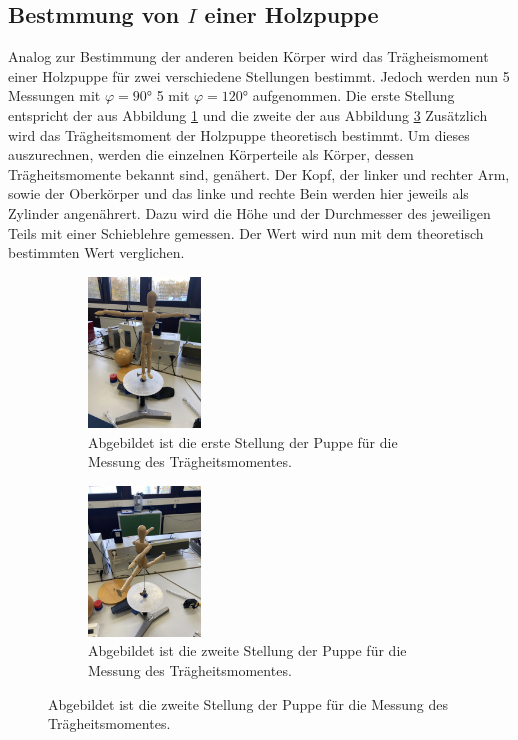     \subsection{Bestmmung von $I$ einer Holzpuppe}
    Analog zur Bestimmung der anderen beiden Körper wird das Trägheismoment einer Holzpuppe für zwei verschiedene Stellungen bestimmt.
    Jedoch werden nun 5 Messungen mit $\varphi= 90$\unit{\degree} 5  mit $\varphi= 120$\unit{\degree} aufgenommen.
    Die erste Stellung entspricht der aus Abbildung \ref{fig:Stellung1} und die zweite der aus Abbildung \ref{fig:Stellung2} %
    Zusätzlich wird das Trägheitsmoment der Holzpuppe theoretisch bestimmt.
    Um dieses auszurechnen, werden die einzelnen Körperteile als Körper, dessen Trägheitsmomente bekannt sind, genähert.
    Der Kopf, der linker und rechter Arm, sowie der Oberkörper und das linke und rechte Bein werden hier jeweils als Zylinder angenährert.
    Dazu wird die Höhe und der Durchmesser des jeweiligen Teils mit einer Schieblehre gemessen.
    Der Wert wird nun mit dem theoretisch bestimmten Wert verglichen.\\

    \begin{figure}
      \begin{subfigure}{0.5 \textwidth}
        \includegraphics[height=4cm, angle=270]{Bilder/Stellung1.jpg}
        \caption{Abgebildet ist die erste Stellung der Puppe für die Messung des Trägheitsmomentes.}
       \label{fig:Stellung1}
      \end{subfigure}
      \begin{subfigure}{0.5 \textwidth}
        \includegraphics[height=4cm, angle=270]{Bilder/Stellung2.jpg}
        \caption{Abgebildet ist die zweite Stellung der Puppe für die Messung des Trägheitsmomentes.}
        \label{fig:Stellung2}
      \end{subfigure}
    \end{figure}



